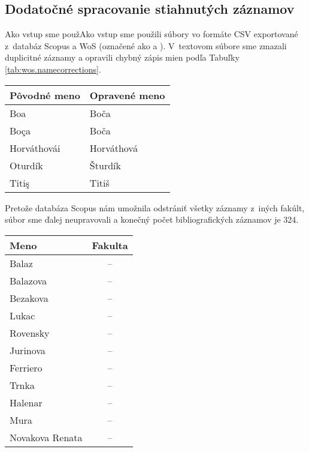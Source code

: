 \subsection{Dodatočné spracovanie stiahnutých záznamov}

Ako vstup sme použAko vstup sme použili súbory vo formáte CSV exportované
z~databáz Scopus a WoS (označené ako  a
).  V~textovom súbore
 sme zmazali duplicitné záznamy a opravili
chybný zápis mien podľa Tabuľky \ref{tab:wos.namecorrections}.

\begin{SCtable}
\caption{Oprava chýb v~menách autorov v~súbore .}
\label{tab:wos.namecorrections}
\centering\small
\begin{tabular}{ll}
  \toprule\noalign{\vspace{.3ex}}
  Pôvodné meno & Opravené meno \\[0.3ex]
  \midrule\noalign{\vspace{.5ex}}
  Boa          & Boča       \\
  Boça         & Boča       \\
  Horváthovái  & Horváthová \\
  Oturdík      & Šturdík    \\
  Titiş        & Titiš      \\[0.5ex]
  \bottomrule
\end{tabular}
\end{SCtable}

Pretože databáza Scopus nám umožnila odstrániť všetky záznamy z~iných fakúlt,
súbor  sme ďalej neupravovali a konečný počet
bibliografických záznamov je 324.

\begin{SCtable}
\caption{Mená pracovníkov, ktorí nepatria do Fakulty prírodných vied.}
\label{tab:wos.excludedstaff}
\centering\small
\begin{tabular}{lc}
  \toprule\noalign{\vspace{.3ex}}
  Meno            & Fakulta \\[0.3ex]
  \midrule\noalign{\vspace{.5ex}}
  Balaz           & -- \\
  Balazova        & -- \\
  Bezakova        & -- \\
  Lukac           & -- \\
  Rovensky        & -- \\[1ex]
  Jurinova        & -- \\
  Ferriero        & -- \\
  Trnka           & -- \\
  Halenar         & -- \\
  Mura            & -- \\[1ex]
  Novakova Renata & -- \\[0.5ex]
  \bottomrule
\end{tabular}
\end{SCtable}

